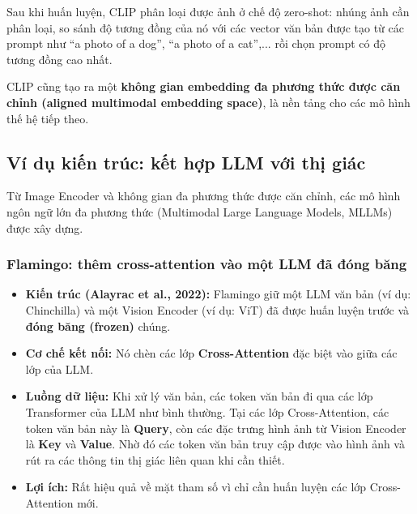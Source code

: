 Sau khi huấn luyện, CLIP phân loại được ảnh ở chế độ zero-shot: nhúng ảnh cần phân loại, so sánh độ tương đồng của nó với các vector văn bản được tạo từ các prompt như “a photo of a dog”, “a photo of a cat”,... rồi chọn prompt có độ tương đồng cao nhất.

CLIP cũng tạo ra một \textbf{không gian embedding đa phương thức được căn chỉnh (aligned multimodal embedding space)}, là nền tảng cho các mô hình thế hệ tiếp theo.

\subsection{Ví dụ kiến trúc: kết hợp LLM với thị giác}
\label{ssec:multimodal_architectures_examples}
Từ Image Encoder và không gian đa phương thức được căn chỉnh, các mô hình ngôn ngữ lớn đa phương thức (Multimodal Large Language Models, MLLMs) được xây dựng.

\subsubsection{Flamingo: thêm cross-attention vào một LLM đã đóng băng}
\begin{itemize}
    \item \textbf{Kiến trúc (Alayrac et al., 2022):} Flamingo giữ một LLM văn bản (ví dụ: Chinchilla) và một Vision Encoder (ví dụ: ViT) đã được huấn luyện trước và \textbf{đóng băng (frozen)} chúng.
    \item \textbf{Cơ chế kết nối:} Nó chèn các lớp \textbf{Cross-Attention} đặc biệt vào giữa các lớp của LLM.
    \item \textbf{Luồng dữ liệu:} Khi xử lý văn bản, các token văn bản đi qua các lớp Transformer của LLM như bình thường. Tại các lớp Cross-Attention, các token văn bản này là \textbf{Query}, còn các đặc trưng hình ảnh từ Vision Encoder là \textbf{Key} và \textbf{Value}. Nhờ đó các token văn bản truy cập được vào hình ảnh và rút ra các thông tin thị giác liên quan khi cần thiết.
    \item \textbf{Lợi ích:} Rất hiệu quả về mặt tham số vì chỉ cần huấn luyện các lớp Cross-Attention mới.
\end{itemize}

